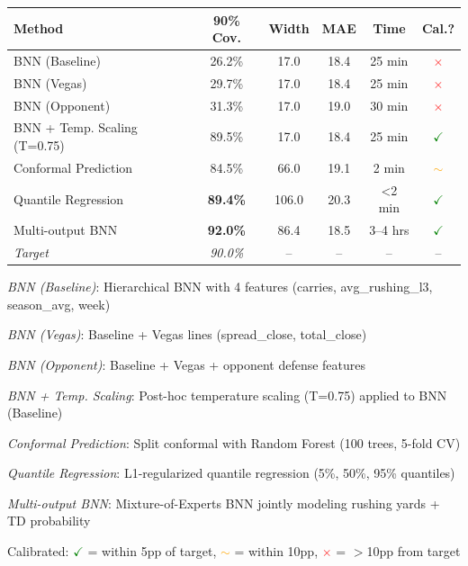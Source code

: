 \begin{threeparttable}
  \small
    \begin{tabular}{lccccc}
      \toprule
      \textbf{Method}  & \textbf{90\% Cov.}  & \textbf{Width}  & \textbf{MAE}  & \textbf{Time}  & \textbf{Cal.?} \\
      \midrule
      BNN (Baseline) & 26.2\% & 17.0 & 18.4 & 25 min & \textcolor{red}{$\times$} \\
      BNN (Vegas) & 29.7\% & 17.0 & 18.4 & 25 min & \textcolor{red}{$\times$} \\
      BNN (Opponent) & 31.3\% & 17.0 & 19.0 & 30 min & \textcolor{red}{$\times$} \\
      BNN + Temp. Scaling (T=0.75) & 89.5\% & 17.0 & 18.4 & 25 min & \textcolor{green}{$\checkmark$} \\
      \midrule
      Conformal Prediction & 84.5\% & 66.0 & 19.1 & 2 min & \textcolor{orange}{$\sim$} \\
      Quantile Regression & \textbf{89.4\%} & 106.0 & 20.3 & \textless{}2 min & \textcolor{green}{$\checkmark$} \\
      Multi-output BNN & \textbf{92.0\%} & 86.4 & 18.5 & 3--4 hrs & \textcolor{green}{$\checkmark$} \\
      \midrule
      \textit{Target} & \textit{90.0\%} & -- & -- & -- & -- \\
      \bottomrule
    \end{tabular}
    \begin{tablenotes}[flushleft]\footnotesize
      \item \textit{BNN (Baseline)}: Hierarchical BNN with 4 features (carries, avg\_rushing\_l3, season\_avg, week)
      \item \textit{BNN (Vegas)}: Baseline + Vegas lines (spread\_close, total\_close)
      \item \textit{BNN (Opponent)}: Baseline + Vegas + opponent defense features
      \item \textit{BNN + Temp. Scaling}: Post-hoc temperature scaling (T=0.75) applied to BNN (Baseline)
      \item \textit{Conformal Prediction}: Split conformal with Random Forest (100 trees, 5-fold CV)
      \item \textit{Quantile Regression}: L1-regularized quantile regression (5\%, 50\%, 95\% quantiles)
      \item \textit{Multi-output BNN}: Mixture-of-Experts BNN jointly modeling rushing yards + TD probability
      \item Calibrated: \textcolor{green}{$\checkmark$} = within 5pp of target, \textcolor{orange}{$\sim$} = within 10pp, \textcolor{red}{$\times$} = $>$10pp from target
    \end{tablenotes}
  \end{threeparttable}
